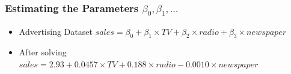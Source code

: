 



\begin{frame}[fragile]\frametitle{Estimating the Parameters $\beta_0,\beta_1,\ldots$}
\begin{itemize}
\item Advertising Dataset
$ sales = \beta_0 + \beta_1 \times TV + \beta_2 \times radio + \beta_3 \times newspaper$
\item After solving
$ sales = 2.93 + 0.0457 \times TV + 0.188 \times radio - 0.0010 \times newspaper$
\end{itemize}
\end{frame}

